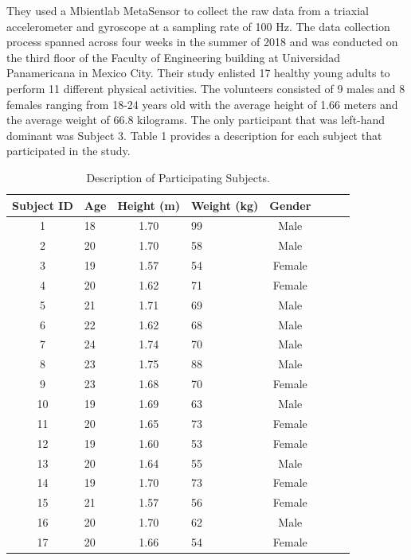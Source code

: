 \documentclass{llncs}
\begin{document}
	They used a Mbientlab MetaSensor to collect the raw data from a triaxial accelerometer and gyroscope at a sampling rate of 100 Hz. The data collection process spanned across four weeks in the summer of 2018 and was conducted on the third floor of the Faculty of Engineering building at Universidad Panamericana in Mexico City. \cite{martinez2019up} Their study enlisted 17 healthy young adults to perform 11 different physical activities. The volunteers consisted of 9 males and 8 females ranging from 18-24 years old with the average height of 1.66 meters and the average weight of 66.8 kilograms. The only participant that was left-hand dominant was Subject 3. Table 1 provides a description for each subject that participated in the study.
	
\begin{table}
	\begin{center}
		\caption{Description of Participating Subjects.}\label{table1}
		\begin{tabular}{clclclc|c}
			\toprule
			Subject ID & Age & Height (m) & Weight (kg) & Gender\\
			\midrule
			1 &  18 & 1.70 & 99 & Male\\
			2 &  20 & 1.70 & 58 & Male\\
			3 & 19 & 1.57 & 54 & Female\\
			4 & 20 & 1.62 & 71 & Female\\
			5 & 21 & 1.71 & 69 & Male\\
			6 & 22 & 1.62 & 68 & Male\\
			7 & 24 & 1.74 & 70 & Male\\
			8 & 23 & 1.75 & 88 & Male\\
			9 & 23 & 1.68 & 70 & Female\\
			10 & 19 & 1.69 & 63 & Male\\
			11 & 20 & 1.65 & 73 & Female\\
			12 & 19 & 1.60 & 53 & Female\\
			13 & 20 & 1.64 & 55 & Male\\
			14 & 19 & 1.70 & 73 & Female\\
			15 & 21 & 1.57 & 56 & Female\\
			16 & 20 & 1.70 & 62 & Male\\
			17 & 20 & 1.66 & 54 & Female\\
			\bottomrule
		\end{tabular}
	\end{center}
\end{table}
\end{document}
